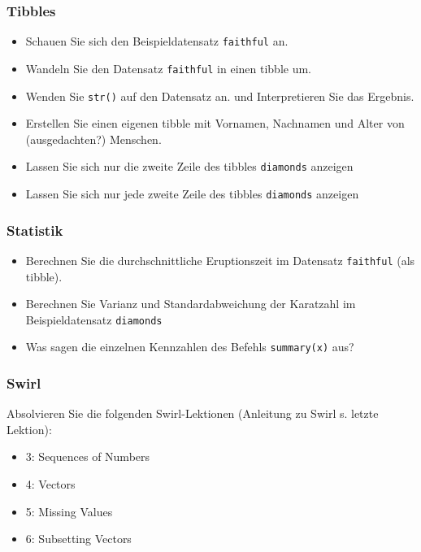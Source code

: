 \documentclass[
  ngerman,
]{article}
\providecommand{\tightlist}{%
  \setlength{\itemsep}{0pt}\setlength{\parskip}{0pt}}
\begin{document}
\hypertarget{tibbles-1}{%
\subsubsection{Tibbles}\label{tibbles-1}}

\begin{itemize}
\tightlist
\item
  Schauen Sie sich den Beispieldatensatz \texttt{faithful} an.
\item
  Wandeln Sie den Datensatz \texttt{faithful} in einen tibble um.
\item
  Wenden Sie \texttt{str()} auf den Datensatz an. und Interpretieren Sie das Ergebnis.
\item
  Erstellen Sie einen eigenen tibble mit Vornamen, Nachnamen und Alter von (ausgedachten?) Menschen.
\item
  Lassen Sie sich nur die zweite Zeile des tibbles \texttt{diamonds} anzeigen
\item
  Lassen Sie sich nur jede zweite Zeile des tibbles \texttt{diamonds} anzeigen
\end{itemize}

\hypertarget{statistik}{%
\subsubsection{Statistik}\label{statistik}}

\begin{itemize}
\tightlist
\item
  Berechnen Sie die durchschnittliche Eruptionszeit im Datensatz \texttt{faithful} (als tibble).
\item
  Berechnen Sie Varianz und Standardabweichung der Karatzahl im Beispieldatensatz \texttt{diamonds}
\item
  Was sagen die einzelnen Kennzahlen des Befehls \texttt{summary(x)} aus?
\end{itemize}

\hypertarget{swirl-1}{%
\subsubsection{Swirl}\label{swirl-1}}

Absolvieren Sie die folgenden Swirl-Lektionen (Anleitung zu Swirl s. letzte Lektion):

\begin{itemize}
\tightlist
\item
  3: Sequences of Numbers
\item
  4: Vectors
\item
  5: Missing Values
\item
  6: Subsetting Vectors
\end{itemize}
\end{document}
